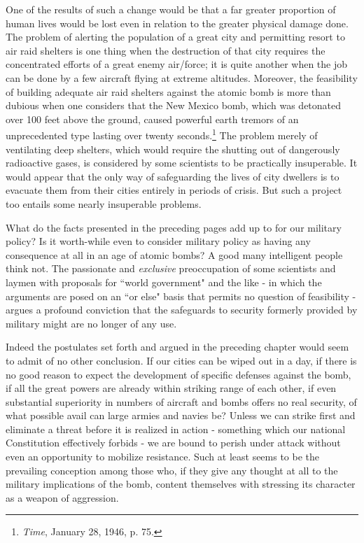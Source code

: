 One of the results of such a change would be that a far greater proportion of human lives would be lost even in relation to the greater physical damage done. The problem of alerting the population of a great city and permitting resort to air raid shelters is one thing when the destruction of that city requires the concentrated efforts of a great enemy air/force; it is quite another when the job can be done by a few aircraft flying at extreme altitudes. Moreover, the feasibility of building adequate air raid shelters against the atomic bomb is more than dubious when one considers that the New Mexico bomb, which was detonated over 100 feet above the ground, caused powerful earth tremors of an unprecedented type lasting over twenty seconds.\footnote{\textit{Time}, January 28, 1946, p. 75.} The problem merely of ventilating deep shelters, which would require the shutting out of dangerously radioactive gases, is considered by some scientists to be practically insuperable. It would appear that the only way of safeguarding the lives of city dwellers is to evacuate them from their cities entirely in periods of crisis. But such a project too entails some nearly insuperable problems.

What do the facts presented in the preceding pages add up to for our military policy? Is it worth-while even to consider military policy as having any consequence at all in an age of atomic bombs? A good many intelligent people think not. The passionate and \emph{exclusive} preoccupation of some scientists and laymen with proposals for ``world government" and the like - in which the arguments are posed on an ``or else" basis that permits no question of feasibility - argues a profound conviction that the safeguards to security formerly provided by military might are no longer of any use.

Indeed the postulates set forth and argued in the preceding chapter would seem to admit of no other conclusion. If our cities can be wiped out in a day, if there is no good reason to expect the development of specific defenses against the bomb, if all the great powers are already within striking range of each other, if even substantial superiority in numbers of aircraft and bombs offers no real security, of what possible avail can large armies and navies be? Unless we can strike first and eliminate a threat before it is realized in action - something which our national Constitution effectively forbids - we are bound to perish under attack without even an opportunity to mobilize resistance. Such at least seems to be the prevailing conception among those who, if they give any thought at all to the military implications of the bomb, content themselves with stressing its character as a weapon of aggression.

